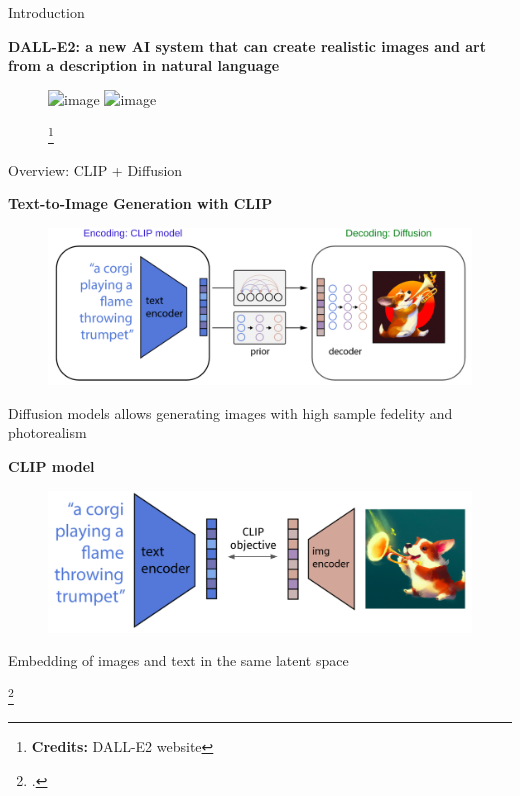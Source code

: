 \documentclass[aspectratio=169, 10pt]{beamer}
\theoremstyle{definition}
\begin{document}
\begin{frame}{Introduction}
  \begin{center}
    \bf\bf DALL-E2: a new AI system that can create realistic images and art from a 
    description in natural language
  \end{center}
  \begin{figure}[h]
    \centering
    \includegraphics<1>[clip, width=0.85\textwidth, trim=0 0 0 0]{./pic/dalle-samples2.png}%
    \includegraphics<2->[clip, width=0.85\textwidth, trim=0 0 0 1.25cm]{./pic/dalle-samples3.png}
    \caption{\footnote{\textbf{Credits:} DALL-E2 website}}
  \end{figure}
\end{frame}
\begin{frame}{Overview: CLIP + Diffusion}
  \begin{minipage}[t]{0.47\textwidth}
    \begin{center}
      \bf Text-to-Image Generation with CLIP
    \end{center}
    \begin{figure}[h]
      \centering
      \includegraphics[width=1\textwidth]{./pic/dalle-encdec.png}
    \end{figure}
    \begin{center}
      Diffusion models allows generating images with  high sample fedelity
      and photorealism
    \end{center}
  \end{minipage}\hfill%
  \begin{minipage}[t]{0.47\textwidth}
    \begin{center}
      \bf CLIP model
    \end{center}
    \begin{figure}[h]
      \vspace{0.25cm}
      \centering
      \includegraphics[width=\textwidth]{./pic/dalle-clip-intro.png}
    \end{figure}
  \begin{center}
    Embedding of images and text in the same latent space
  \end{center}
  \end{minipage}\hfill%
  \footcite{dalle2}
\end{frame}
\end{document}
